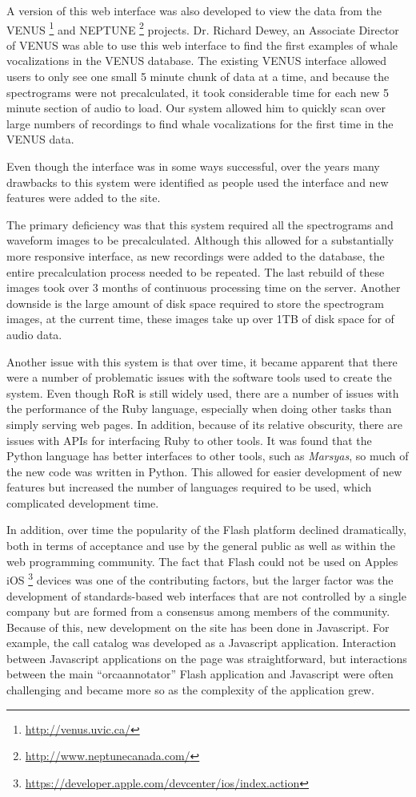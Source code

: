 A version of this web interface was also developed to view the data
from the VENUS \footnote{\url{http://venus.uvic.ca/}} and
NEPTUNE \footnote{\url{http://www.neptunecanada.com/}} projects.
Dr. Richard Dewey, an Associate Director of VENUS was able to use this
web interface to find the first examples of whale vocalizations in the
VENUS database.  The existing VENUS interface allowed users to only
see one small 5 minute chunk of data at a time, and because the
spectrograms were not precalculated, it took considerable time for
each new 5 minute section of audio to load.  Our system allowed him to
quickly scan over large numbers of recordings to find whale
vocalizations for the first time in the VENUS data.

Even though the interface was in some ways successful, over the years
many drawbacks to this system were identified as people used the
interface and new features were added to the site.

The primary deficiency was that this system required all the
spectrograms and waveform images to be precalculated.  Although this
allowed for a substantially more responsive interface, as new
recordings were added to the database, the entire precalculation
process needed to be repeated.  The last rebuild of these images took
over 3 months of continuous processing time on the server.  Another
downside is the large amount of disk space required to store the
spectrogram images, at the current time, these images take up over 1TB
of disk space for {\diskSpaceOrchive} of audio data.

Another issue with this system is that over time, it became apparent
that there were a number of problematic issues with the software tools
used to create the system.  Even though RoR is still widely used,
there are a number of issues with the performance of the Ruby
language, especially when doing other tasks than simply serving web
pages.  In addition, because of its relative obscurity, there are
issues with APIs for interfacing Ruby to other tools.  It was found
that the Python language has better interfaces to other tools, such as
\textit{Marsyas}, so much of the new code was written in Python.  This allowed
for easier development of new features but increased the number of
languages required to be used, which complicated development time.

In addition, over time the popularity of the Flash platform declined
dramatically, both in terms of acceptance and use by the general
public as well as within the web programming community.  The fact that
Flash could not be used on Apples
iOS \footnote{\url{https://developer.apple.com/devcenter/ios/index.action}}
devices was one of the contributing factors, but the larger factor was
the development of standards-based web interfaces that are not
controlled by a single company but are formed from a consensus among
members of the community.  Because of this, new development on the
site has been done in Javascript.  For example, the call catalog was
developed as a Javascript application.  Interaction between Javascript
applications on the page was straightforward, but interactions between
the main ``orcaannotator'' Flash application and Javascript were often
challenging and became more so as the complexity of the application
grew.

